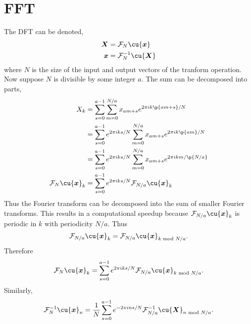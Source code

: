 \documentclass[11pt, a4paper]{article}
\begin{document}
\section{FFT}
The DFT can be denoted,
\begin{equation}\begin{aligned}
    \vec{X} &= \mathcal{F}_{N}\cu{\vec{x}} \\
    \vec{x} &= \mathcal{F}_{N}^{-1}\cu{\vec{X}} \\
\end{aligned}\end{equation}
where $N$ is the size of the input and output vectors of the tranform operation.
Now suppose $N$ is divisible by some integer $a$.
The sum can be decomposed into parts,
\begin{equation}\begin{aligned}
    X_{k}
    &= \sum_{s=0}^{a-1} \sum_{m=0}^{ N/a } x_{am + s} e^{2 \pi i k \p{am + s} / N} \\
    &= \sum_{s=0}^{a-1} e^{2 \pi i k s/N}\sum_{m=0}^{ N/a } x_{am + s} e^{2 \pi i k \p{am} / N} \\
    &= \sum_{s=0}^{a-1} e^{2 \pi i k s/N}\sum_{m=0}^{ N/a } x_{am + s} e^{2 \pi i k m / \p{N/a}} \\
    \mathcal{F}_{N} \cu{\vec{x}}_{k} &= \sum_{s=0}^{a-1} e^{2 \pi i k s/N} \mathcal{F}_{N/a} \cu{\vec{x}}_{k} \\
\end{aligned}\end{equation}
Thus the Fourier transform can be decomposed into the sum of smaller Fourier transforms. This results in a computational
speedup because $\mathcal{F}_{N/a} \cu{\vec{x}}_{k}$ is periodic in $k$ with periodicity $N/a$. Thus
\begin{equation}\begin{aligned}
    \mathcal{F}_{N/a} \cu{\vec{x}}_{k} = \mathcal{F}_{N/a} \cu{\vec{x}}_{k \text{ mod } N/a}.
\end{aligned}\end{equation}
Therefore
\begin{equation}\begin{aligned}
    \mathcal{F}_{N} \cu{\vec{x}}_{k} &= \sum_{s=0}^{a-1} e^{2 \pi i k s/N} \mathcal{F}_{N/a} \cu{\vec{x}}_{k \text{ mod } N/a}. \\
\end{aligned}\end{equation}
Similarly,
\begin{equation}\begin{aligned}
    \mathcal{F}^{-1}_{N} \cu{\vec{x}}_{n} = \frac{1}{N} \sum_{s=0}^{a-1} e^{-2 \pi i n s /N} \mathcal{F}_{N/a}^{-1} \cu{\vec{X}}_{n \text{ mod } N/a}.
\end{aligned}\end{equation}
\end{document}
